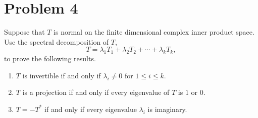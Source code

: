 \documentclass[10pt,a4paper]{article}
\theoremstyle{definition}
\begin{document}
\section*{Problem 4}
Suppose that $T$ is normal on the finite dimensional complex inner product
space. Use the spectral decomposition of $T$,
\[T = \lambda_1 T_1 + \lambda_2 T_2 + \cdots + \lambda_k T_k,\]
to prove the following results.
\begin{enumerate}
\item $T$ is invertible if and only if $\lambda_i \neq 0$ for $1 \leq i \leq
k$.
\item $T$ is a projection if and only if every eigenvalue of $T$ is $1$ or $0$.
\item $T = - T^*$ if and only if every eigenvalue $\lambda_i$ is imaginary.
\end{enumerate}
\end{document}
